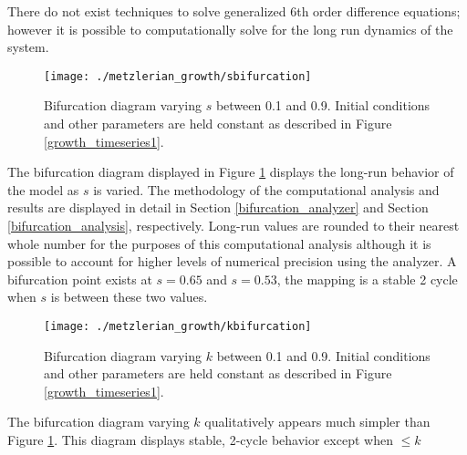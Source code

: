 There do not exist techniques to solve generalized 6th order difference equations; however it is possible to computationally solve for the long run dynamics of the system.
\begin{figure}
    \centering
    \texttt{[image: ./metzlerian\_growth/sbifurcation]}
    \caption{Bifurcation diagram varying $s$ between 0.1 and 0.9. Initial conditions and other parameters are held constant as described in Figure \ref{growth_timeseries1}.}
    \label{metzlerian_growth-sbifurcation}
\end{figure}

The bifurcation diagram displayed in Figure \ref{metzlerian_growth-sbifurcation} displays the long-run behavior of the model as $s$ is varied. The methodology of the computational analysis and results are displayed in detail in Section \ref{bifurcation_analyzer} and Section \ref{bifurcation_analysis}, respectively. Long-run values are rounded to their nearest whole number for the purposes of this computational analysis although it is possible to account for higher levels of numerical precision using the analyzer. A bifurcation point exists at $s=0.65$ and $s=0.53$, the mapping is a stable 2 cycle when $s$ is between these two values. 

\begin{figure}
    \centering
    \texttt{[image: ./metzlerian\_growth/kbifurcation]}
    \caption{Bifurcation diagram varying $k$ between 0.1 and 0.9. Initial conditions and other parameters are held constant as described in Figure \ref{growth_timeseries1}.}
    \label{metzlerian_growth-kbifurcation}
\end{figure}

The bifurcation diagram varying $k$ qualitatively appears much simpler than Figure \ref{metzlerian_growth-sbifurcation}. This diagram displays stable, 2-cycle behavior except when $\leq k$










